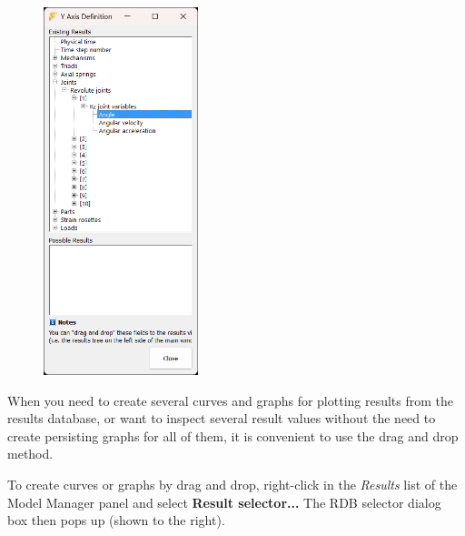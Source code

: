 \def\fwidth{0.4\textwidth}
\begin{figure}
  \vspace{-5mm}
  \includegraphics[width=\fwidth]{Figures/Dialogs/7-RDB-Selector-DragAndDrop}
\end{figure}

When you need to create several curves and \newline graphs for plotting results
from the results \newline database, or want to inspect several result values
without the need to create persisting graphs for all of them,
it is convenient to use the drag and drop method.

To create curves or graphs by drag and drop, right-click in the {\sl Results}
list of the Model Manager panel and select \textbf{Result selector...}
The RDB selector dialog box then pops up (shown to the right).

